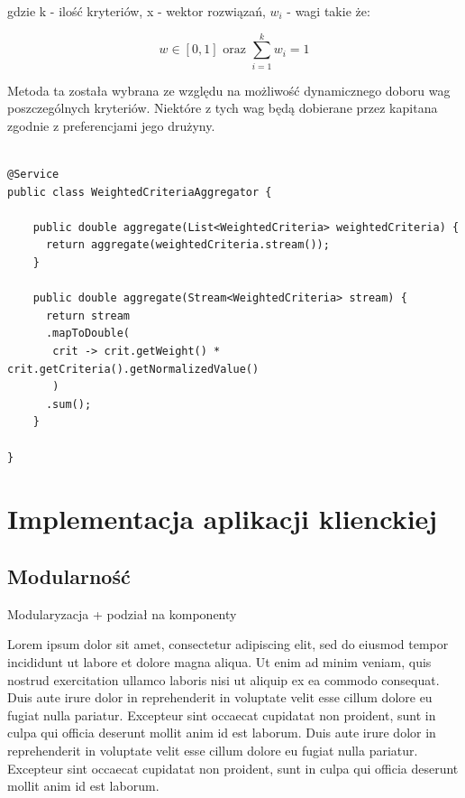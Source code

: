 gdzie k - ilość kryteriów, x - wektor rozwiązań, $w_{i}$ - wagi takie że:

\begin{equation*}
w \in [0, 1] \mbox{ oraz } \sum_{i=1}^{k}w_{i} = 1
\end{equation*}

Metoda ta została wybrana ze względu na możliwość dynamicznego doboru wag poszczególnych kryteriów. Niektóre z tych wag będą dobierane przez kapitana zgodnie z preferencjami jego drużyny. 


\begin{minipage}{\linewidth}
\begin{lstlisting}[label=list:resource, caption=Przykładowa rejestracja kontrolera, basicstyle=\footnotesize\ttfamily]

@Service
public class WeightedCriteriaAggregator {

    public double aggregate(List<WeightedCriteria> weightedCriteria) {
      return aggregate(weightedCriteria.stream());
    }

    public double aggregate(Stream<WeightedCriteria> stream) {
      return stream
      .mapToDouble(
       crit -> crit.getWeight() * crit.getCriteria().getNormalizedValue()
       )
      .sum();
    }

}

\end{lstlisting}
\end{minipage}

\section{Implementacja aplikacji klienckiej}

\subsection{Modularność}

Modularyzacja + podział na komponenty

Lorem ipsum dolor sit amet, consectetur adipiscing elit, sed do eiusmod tempor incididunt ut labore et dolore magna aliqua. Ut enim ad minim veniam, quis nostrud exercitation ullamco laboris nisi ut aliquip ex ea commodo consequat. Duis aute irure dolor in reprehenderit in voluptate velit esse cillum dolore eu fugiat nulla pariatur. Excepteur sint occaecat cupidatat non proident, sunt in culpa qui officia deserunt mollit anim id est laborum. Duis aute irure dolor in reprehenderit in voluptate velit esse cillum dolore eu fugiat nulla pariatur. Excepteur sint occaecat cupidatat non proident, sunt in culpa qui officia deserunt mollit anim id est laborum. 


